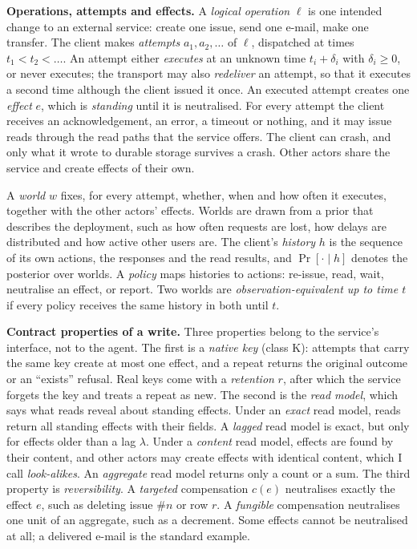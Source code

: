 \documentclass[
  10pt,
]{article}
\begin{document}
\textbf{Operations, attempts and effects.} A \emph{logical operation}
\(\ell\) is one intended change to an external service: create one
issue, send one e-mail, make one transfer. The client makes
\emph{attempts} \(a_1, a_2, \dots\) of \(\ell\), dispatched at times
\(t_1 < t_2 < \dots\). An attempt either \emph{executes} at an unknown
time \(t_i + \delta_i\) with \(\delta_i \ge 0\), or never executes; the
transport may also \emph{redeliver} an attempt, so that it executes a
second time although the client issued it once. An executed attempt
creates one \emph{effect} \(e\), which is \emph{standing} until it is
neutralised. For every attempt the client receives an acknowledgement,
an error, a timeout or nothing, and it may issue reads through the read
paths that the service offers. The client can crash, and only what it
wrote to durable storage survives a crash. Other actors share the
service and create effects of their own.

A \emph{world} \(w\) fixes, for every attempt, whether, when and how
often it executes, together with the other actors' effects. Worlds are
drawn from a prior that describes the deployment, such as how often
requests are lost, how delays are distributed and how active other users
are. The client's \emph{history} \(h\) is the sequence of its own
actions, the responses and the read results, and \(\Pr[\cdot \mid h]\)
denotes the posterior over worlds. A \emph{policy} maps histories to
actions: re-issue, read, wait, neutralise an effect, or report. Two
worlds are \emph{observation-equivalent up to time \(t\)} if every
policy receives the same history in both until \(t\).

\textbf{Contract properties of a write.} Three properties belong to the
service's interface, not to the agent. The first is a \emph{native key}
(class K): attempts that carry the same key create at most one effect,
and a repeat returns the original outcome or an ``exists'' refusal. Real
keys come with a \emph{retention} \(r\), after which the service forgets
the key and treats a repeat as new. The second is the \emph{read model},
which says what reads reveal about standing effects. Under an
\emph{exact} read model, reads return all standing effects with their
fields. A \emph{lagged} read model is exact, but only for effects older
than a lag \(\lambda\). Under a \emph{content} read model, effects are
found by their content, and other actors may create effects with
identical content, which I call \emph{look-alikes}. An \emph{aggregate}
read model returns only a count or a sum. The third property is
\emph{reversibility}. A \emph{targeted} compensation \(c(e)\)
neutralises exactly the effect \(e\), such as deleting issue \#\(n\) or
row \(r\). A \emph{fungible} compensation neutralises one unit of an
aggregate, such as a decrement. Some effects cannot be neutralised at
all; a delivered e-mail is the standard example.
\end{document}
